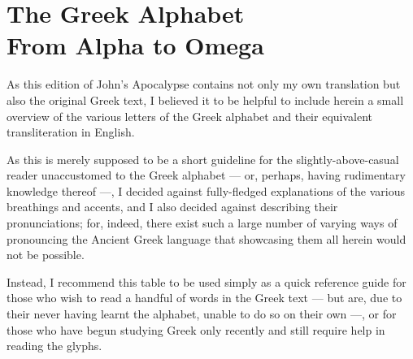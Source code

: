 \chapter*{The Greek Alphabet \\ \large From Alpha to Omega}
  
As this edition of John's Apocalypse contains not only my own translation but also the original Greek text, I believed it to be helpful to include herein a small overview of the various letters of the Greek alphabet and their equivalent transliteration in English. 

As this is merely supposed to be a short guideline for the slightly-above-casual reader unaccustomed to the Greek alphabet — or, perhaps, having rudimentary knowledge thereof —, I decided against fully-fledged explanations of the various breathings and accents, and I also decided against describing their pronunciations; for, indeed, there exist such a large number of varying ways of pronouncing the Ancient Greek language that showcasing them all herein would not be possible. 

Instead, I recommend this table to be used simply as a quick reference guide for those who wish to read a handful of words in the Greek text — but are, due to their never having learnt the alphabet, unable to do so on their own —, or for those who have begun studying Greek only recently and still require help in reading the glyphs. 
  
